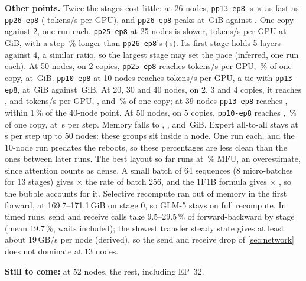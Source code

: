 \textbf{Other points.} Twice the stages cost little: at 26 nodes, \texttt{pp13-ep8} is $\times$\TriGlmPpRatio{} as fast as \texttt{pp26-ep8} (\TriGlmPpTwoSixTok{} tokens/s per GPU), and \texttt{pp26-ep8} peaks at \TriGlmPpTwoSixMem\,GiB against \TriGlmEpEightMem. One copy against 2, one run each. \texttt{pp25-ep8} at 25 nodes is slower, \TriGlmPpTwoFiveTok{} tokens/s per GPU at \TriGlmPpTwoFiveMem\,GiB, with a step \TriGlmPpStepPct\,\% longer than \texttt{pp26-ep8}'s (\TriGlmPpTwoFiveStep\,s). Its first stage holds 5 layers against 4, a similar ratio, so the largest stage may set the pace (inferred, one run each). At 50 nodes, on 2 copies, \texttt{pp25-ep8} reaches \TriGlmPpTwoFiveFiftyTok{} tokens/s per GPU, \TriGlmPpTwoFiveFiftyEff\,\% of one copy, at \TriGlmPpTwoFiveFiftyMem\,GiB. \texttt{pp10-ep8} at 10 nodes reaches \TriGlmTenTok{} tokens/s per GPU, a tie with \texttt{pp13-ep8}, at \TriGlmTenMem\,GiB against \TriGlmThirteenMem\,GiB. At 20, 30 and 40 nodes, on 2, 3 and 4 copies, it reaches \TriGlmTwentyTok, \TriGlmThirtyTok{} and \TriGlmFortyTok{} tokens/s per GPU, \TriGlmTwentyEff, \TriGlmThirtyEff{} and \TriGlmFortyEff\,\% of one copy; at 39 nodes \texttt{pp13-ep8} reaches \TriGlmWeakThreeTok, within 1\,\% of the 40-node point. At 50 nodes, on 5 copies, \texttt{pp10-ep8} reaches \TriGlmFiftyTok, \TriGlmFiftyEff\,\% of one copy, at \TriGlmFiftyStep\,s per step. Memory falls to \TriGlmTwentyMem, \TriGlmThirtyMem, \TriGlmFortyMem{} and \TriGlmFiftyMem\,GiB. Expert all-to-all stays at \TriGlmFiftyAtoa\,s per step up to 50 nodes: these groups sit inside a node. One run each, and the 10-node run predates the reboots, so these percentages are less clean than the ones between later runs. The best layout so far runs at \TriGlmThirteenMfu\,\% MFU, an overestimate, since attention counts as dense. A small batch of 64 sequences (8 micro-batches for 13 stages) gives $\times$\TriGlmSmallRatio{} the rate of batch 256, and the 1F1B formula gives $\times$\TriGlmSmallFormula{} \est{}, so the bubble accounts for it. Selective recompute ran out of memory in the first forward, at 169.7--171.1\,GiB on stage 0, so GLM-5 stays on full recompute. In timed runs, send and receive calls take 9.5--29.5\,\% of forward-backward by stage (mean 19.7\,\%, waits included); the slowest transfer steady state gives at least about 19\,GB/s per node (derived), so the send and receive drop of \cref{sec:network} does not dominate at 13 nodes.

\textbf{Still to come:} at 52 nodes, the rest, including EP~32.
